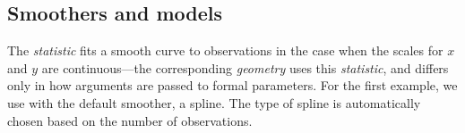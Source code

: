 \documentclass[krantz2]{krantz}\usepackage{knitr}%
\begin{document}
\begin{knitrout}\footnotesize
{}\color{fgcolor}\begin{kframe}
\begin{alltt}
 \hlkwb{<-} \hlopt{::}
 \hlkwb{<-} \hlopt{::}  \hlstd{=} 
                                     \hlstd{=}  \hlopt{/} \hlstd{(}\hlstd{()))}

 \hlstd{(} 
                      
                       \hlopt{+} 
                       \hlopt{-}  \hlopt{+}
  \hlstd{()} \hlopt{+}
  \hlstd{(} \hlstd{=} \hlstd{,}  \hlstd{=} \hlstd{,}  \hlstd{=} \hlstd{)}
\end{alltt}
\end{kframe}
\end{knitrout}

\subsection{Smoothers and models}
The \emph{statistic}  fits a smooth curve to observations in the case when the scales for $x$ and $y$ are continuous---the corresponding \emph{geometry}  uses this \emph{statistic}, and differs only in how arguments are passed to formal parameters. For the first example, we use  with the default smoother, a spline. The type of spline is automatically chosen based on the number of observations.

\begin{knitrout}\footnotesize
{}\color{fgcolor}\begin{kframe}
\begin{alltt}
\hlstd{(}  \hlstd{(}    \hlopt{+}
       \hlstd{()}
\end{alltt}
\end{kframe}
\end{knitrout}
\end{document}
